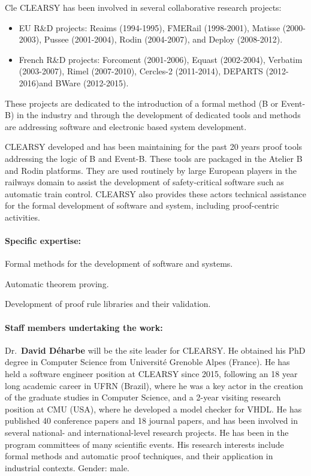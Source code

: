 \begin{sitedescription}{Cle}
CLEARSY has been involved in several collaborative research projects:
\begin{itemize}
\item EU R\&D projects: Reaims (1994-1995), FMERail (1998-2001), Matisse (2000-2003), Pussee (2001-2004), Rodin (2004-2007), and Deploy (2008-2012).
\item French R\&D projects: Forcoment (2001-2006), Equast (2002-2004), Verbatim (2003-2007), Rimel (2007-2010), Cercles-2 (2011-2014), DEPARTS (2012-2016)and BWare (2012-2015).
\end{itemize}

These projects are dedicated to the introduction of a formal method (B or Event-B) in the industry and through the development
of dedicated tools and methods are addressing software and electronic based system development.

CLEARSY developed and has been maintaining for the past 20 years proof tools addressing the logic of B and Event-B. These tools are 
packaged in the Atelier B and Rodin platforms. They are used routinely by large European players in the railways domain to assist the
development of safety-critical software such as automatic train control. CLEARSY also provides these actors technical assistance for the formal development of software and system, including proof-centric activities. 

\paragraph{Specific expertise:}

\begin{compactitem}
\item Formal methods for the development of software and systems.
\item Automatic theorem proving.
\item Development of proof rule libraries and their validation.
\end{compactitem}

\paragraph{Staff members undertaking the work:}

Dr.\ \textbf{David Déharbe} will be the site leader for CLEARSY. He obtained his PhD degree in Computer Science from Université Grenoble Alpes 
(France). He has held a software engineer position at CLEARSY since 2015, following an 18 year long academic career in UFRN (Brazil), 
where he was a key actor in the creation of the graduate studies in Computer Science, and a 2-year visiting research position at CMU 
(USA), where he developed a model checker for VHDL. He has published 40 conference papers and 18 journal papers, and has been involved 
in several national- and international-level research projects. He has been in the program committees of many scientific events. His 
research interests include formal methods and automatic proof techniques, and their application in industrial contexts. Gender: male.


\end{sitedescription}

